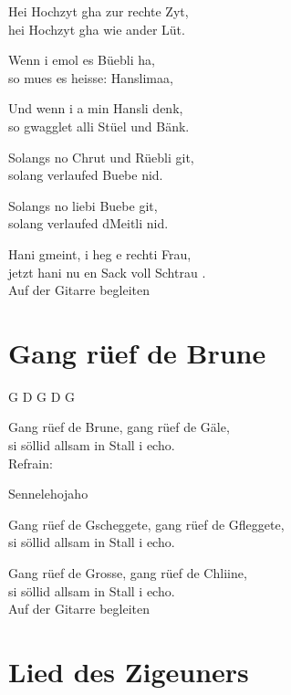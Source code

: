 \documentclass[
  letterpaper,
]{scrbook}
\begin{document}
Hei Hochzyt gha zur rechte Zyt,\\
hei Hochzyt gha wie ander Lüt.

Wenn i emol es Büebli ha,\\
so mues es heisse: Hanslimaa,

Und wenn i a min Hansli denk,\\
so gwagglet alli Stüel und Bänk.

Solangs no Chrut und Rüebli git,\\
solang verlaufed Buebe nid.

Solangs no liebi Buebe git,\\
solang verlaufed d\textquotesingle Meitli nid.

Hani gmeint, i heg e rechti Frau,\\
jetzt hani nu en Sack voll Schtrau .\\
Auf der Gitarre begleiten

\hypertarget{gang-ruxfcef-de-brune}{%
\chapter{Gang rüef de Brune}\label{gang-ruxfcef-de-brune}}

G D G D G

Gang rüef de Brune, gang rüef de Gäle,\\
si söllid allsam in Stall i echo.\\
Refrain:

Sennelehojaho

Gang rüef de Gscheggete, gang rüef de Gfleggete,\\
si söllid allsam in Stall i echo.

Gang rüef de Grosse, gang rüef de Chliine,\\
si söllid allsam in Stall i echo.\\
Auf der Gitarre begleiten

\hypertarget{lied-des-zigeuners}{%
\chapter{Lied des Zigeuners}\label{lied-des-zigeuners}}
\end{document}
